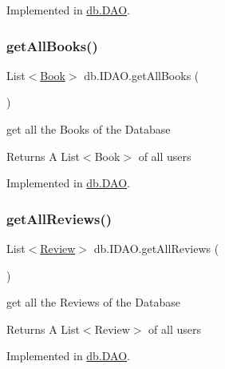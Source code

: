 Implemented in \hyperlink{classdb_1_1_d_a_o_aa033f83155deb72d59492bcb2b8e4d3a}{db.\+D\+AO}.

\mbox{\label{interfacedb_1_1_i_d_a_o_a75a5ebcd7c3421ae7cccc8e2f3b2d9f9}} 
\subsubsection{\texorpdfstring{get\+All\+Books()}{getAllBooks()}}
{\footnotesize\ttfamily List$<$\hyperlink{classserver_1_1data_1_1_book}{Book}$>$ db.\+I\+D\+A\+O.\+get\+All\+Books (\begin{DoxyParamCaption}{ }\end{DoxyParamCaption})}

get all the Books of the Database \begin{DoxyReturn}{Returns}
A List$<$\+Book$>$ of all users 
\end{DoxyReturn}


Implemented in \hyperlink{classdb_1_1_d_a_o_a82a8c60ccd0de2f70b69bc36d29aeef8}{db.\+D\+AO}.

\mbox{\label{interfacedb_1_1_i_d_a_o_a3d9625d7e5426aad3c2e70fd0174e5f0}} 
\subsubsection{\texorpdfstring{get\+All\+Reviews()}{getAllReviews()}}
{\footnotesize\ttfamily List$<$\hyperlink{classserver_1_1data_1_1_review}{Review}$>$ db.\+I\+D\+A\+O.\+get\+All\+Reviews (\begin{DoxyParamCaption}{ }\end{DoxyParamCaption})}

get all the Reviews of the Database \begin{DoxyReturn}{Returns}
A List$<$\+Review$>$ of all users 
\end{DoxyReturn}


Implemented in \hyperlink{classdb_1_1_d_a_o_a4df79c7d44b050aa55451db2ecf342f6}{db.\+D\+AO}.

\mbox{\label{interfacedb_1_1_i_d_a_o_a88b60729d9517ca9aa31b7db7ae07aee}} 

